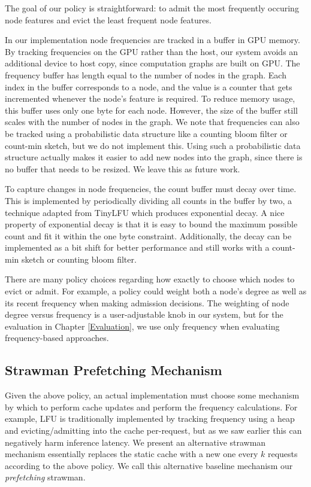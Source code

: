 The goal of our policy is straightforward: to admit the most frequently occuring node features and evict the least frequent node features. 

In our implementation node frequencies are tracked in a buffer in GPU memory. By tracking frequencies on the GPU rather than the host, our system avoids an additional device to host copy, since computation graphs are built on GPU. The frequency buffer has length equal to the number of nodes in the graph.
Each index in the buffer corresponds to a node, and the value is a counter that gets incremented whenever the node's feature is required.
To reduce memory usage, this buffer uses only one byte for each node. 
However, the size of the buffer still scales with the number of nodes in the graph. We note that frequencies can also be tracked using a probabilistic data structure like a counting bloom filter or count-min sketch, but we do not implement this.
Using such a probabilistic data structure actually makes it easier to add new nodes into the graph, since there is no buffer that needs to be resized.
We leave this as future work.

To capture changes in node frequencies, the count buffer must decay over time.
This is implemented by periodically dividing all counts in the buffer by two, a technique adapted from TinyLFU \cite{TinyLFU_2014} which produces exponential decay.
A nice property of exponential decay is that it is easy to bound the maximum possible count and fit it within the one byte constraint. 
Additionally, the decay can be implemented as a bit shift for better performance and still works with a count-min sketch or counting bloom filter.

There are many policy choices regarding how exactly to choose which nodes to evict or admit. 
For example, a policy could weight both a node's degree as well as its recent frequency when making admission decisions. 
The weighting of node degree versus frequency is a user-adjustable knob in our system, but for the evaluation in Chapter \ref{Evaluation}, we use only frequency when evaluating frequency-based approaches.


\subsection{Strawman Prefetching Mechanism}
Given the above policy, an actual implementation must choose some mechanism by which to perform cache updates and perform the frequency calculations. For example, LFU is traditionally implemented by tracking frequency using a heap and evicting/admitting into the cache per-request, but as we saw earlier this can negatively harm inference latency. We present an alternative strawman mechanism essentially replaces the static cache with a new one every $k$ requests according to the above policy. We call this alternative baseline mechanism our \textit{prefetching} strawman. 

